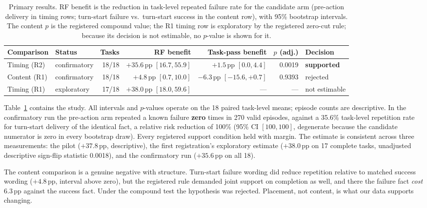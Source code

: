\documentclass[11pt]{article}
\newcommand{\pp}{\ensuremath{\,\mathrm{pp}}}
\begin{document}
\begin{table}[t]
\centering
\small
\begin{tabular}{llrrrrl}
\toprule
Comparison & Status & Tasks & RF benefit & Task-pass benefit & $p$ (adj.) & Decision \\
\midrule
Timing (R2) & confirmatory & 18/18 & $+35.6\pp$ $[16.7, 55.9]$ & $+1.5\pp$ $[0.0, 4.4]$ & 0.0019 & \textbf{supported} \\
Content (R1) & confirmatory & 18/18 & $+4.8\pp$ $[0.7, 10.0]$ & $-6.3\pp$ $[-15.6, +0.7]$ & 0.9393 & rejected \\
Timing (R1) & exploratory & 17/18 & $+38.0\pp$ $[18.0, 59.6]$ & --- & --- & not estimable \\
\bottomrule
\end{tabular}
\caption{Primary results. RF benefit is the reduction in task-level repeated
failure rate for the candidate arm (pre-action delivery in timing rows;
turn-start failure vs.\ turn-start success in the content row), with 95\%
bootstrap intervals. The content $p$ is the registered compound value; the
R1 timing row is exploratory by the registered zero-cut rule; because its
decision is not estimable, no $p$-value is shown for it.}
\label{tab:primary}
\end{table}

Table~\ref{tab:primary} contains the study. All intervals and $p$-values
operate on the 18 paired task-level means; episode counts are descriptive.
In the confirmatory run the pre-action arm repeated a known failure
\textbf{zero} times in 270 valid episodes, against a 35.6\% task-level
repetition rate for turn-start delivery of the identical fact, a relative
risk reduction of 100\% (95\% CI $[100, 100]$, degenerate because the
candidate numerator is zero in every bootstrap draw). Every registered support
condition held with margin. The estimate is consistent across three
measurements: the pilot ($+37.8\pp$, descriptive), the first registration's
exploratory estimate ($+38.0\pp$ on 17 complete tasks, unadjusted
descriptive sign-flip statistic 0.0018), and the confirmatory run
($+35.6\pp$ on all 18).

The content comparison is a genuine negative with structure. Turn-start
failure wording did reduce repetition relative to matched success wording
($+4.8\pp$, interval above zero), but the registered rule demanded joint
support on completion as well, and there the failure fact \emph{cost}
$6.3\pp$ against the success fact. Under the compound test the hypothesis
was rejected. Placement, not content, is what our data supports changing.
\end{document}
